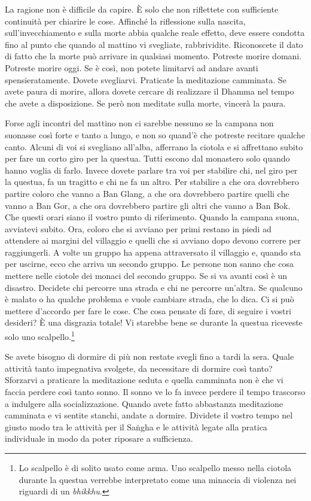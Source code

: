 La ragione non è difficile da capire. È solo che non riflettete con
sufficiente continuità per chiarire le cose. Affinché la riflessione
sulla nascita, sull'invecchiamento e sulla morte abbia qualche reale
effetto, deve essere condotta fino al punto che quando al mattino vi
svegliate, rabbrividite. Riconoscete il dato di fatto che la morte può
arrivare in qualsiasi momento. Potreste morire domani. Potreste morire
oggi. Se è così, non potete limitarvi ad andare avanti spensieratamente.
Dovete svegliarvi. Praticate la meditazione camminata. Se avete paura di
morire, allora dovete cercare di realizzare il Dhamma nel tempo che
avete a disposizione. Se però non meditate sulla morte, vincerà la
paura.

Forse agli incontri del mattino non ci sarebbe nessuno se la campana non
suonasse così forte e tanto a lungo, e non so quand'è che potreste
recitare qualche canto. Alcuni di voi si svegliano all'alba, afferrano
la ciotola e si affrettano subito per fare un corto giro per la questua.
Tutti escono dal monastero solo quando hanno voglia di farlo. Invece
dovete parlare tra voi per stabilire chi, nel giro per la questua, fa un
tragitto e chi ne fa un altro. Per stabilire a che ora dovrebbero
partire coloro che vanno a Ban Glang, a che ora dovrebbero partire
quelli che vanno a Ban Gor, a che ora dovrebbero partire gli altri che
vanno a Ban Bok. Che questi orari siano il vostro punto di riferimento.
Quando la campana suona, avviatevi subito. Ora, coloro che si avviano
per primi restano in piedi ad attendere ai margini del villaggio e
quelli che si avviano dopo devono correre per raggiungerli. A volte un
gruppo ha appena attraversato il villaggio e, quando sta per uscirne,
ecco che arriva un secondo gruppo. Le persone non sanno che cosa mettere
nelle ciotole dei monaci del secondo gruppo. Se si va avanti così è un
disastro. Decidete chi percorre una strada e chi ne percorre un'altra.
Se qualcuno è malato o ha qualche problema e vuole cambiare strada, che
lo dica. Ci si può mettere d'accordo per fare le cose. Che cosa pensate
di fare, di seguire i vostri desideri? È una disgrazia totale! Vi
starebbe bene se durante la questua riceveste solo uno
scalpello.\footnote{Lo scalpello è di solito usato come arma. Uno
  scalpello messo nella ciotola durante la questua verrebbe interpretato
  come una minaccia di violenza nei riguardi di un \emph{bhikkhu}.}

Se avete bisogno di dormire di più non restate svegli fino a tardi la
sera. Quale attività tanto impegnativa svolgete, da necessitare di
dormire così tanto? Sforzarvi a praticare la meditazione seduta e quella
camminata non è che vi faccia perdere così tanto sonno. Il sonno ve lo
fa invece perdere il tempo trascorso a indulgere alla socializzazione.
Quando avete fatto abbastanza meditazione camminata e vi sentite
stanchi, andate a dormire. Dividete il vostro tempo nel giusto modo tra
le attività per il Saṅgha e le attività legate alla pratica individuale
in modo da poter riposare a sufficienza.


